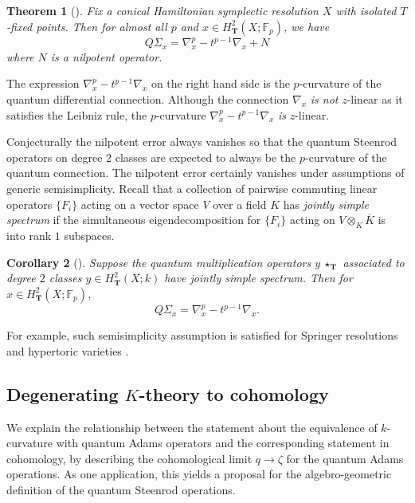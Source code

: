 \documentclass[reqno]{amsart}
\numberwithin{equation}{section}
\numberwithin{equation}{section}
\numberwithin{equation}{section}
\newtheorem{thm}{Theorem}[section]
\newtheorem{cor}[thm]{Corollary}
\theoremstyle{definition}
\theoremstyle{remark}
\theoremstyle{remark}
\begin{document}
\begin{thm}[{\cite[Theorem 1.2]{Lee23b}}]\label{thm:qst-is-pcurv}
    Fix a conical Hamiltonian symplectic resolution $X$ with isolated $T$-fixed points. Then for almost all $p$ and $x \in H^2_{\mathbf{T}}(X;\mathbb{F}_p)$, we have
    \begin{equation}
        Q\Sigma_x = \nabla_x^p - t^{p-1} \nabla_x + N
    \end{equation}
    where $N$ is a nilpotent operator.
\end{thm}
The expression $\nabla_x^p - t^{p-1}\nabla_x$ on the right hand side is the $p$-curvature of the quantum differential connection. Although the connection $\nabla_x$ \emph{is not} $z$-linear as it satisfies the Leibniz rule, the $p$-curvature $\nabla_x^p - t^{p-1} \nabla_x$ \emph{is} $z$-linear.

Conjecturally the nilpotent error always vanishes so that the quantum Steenrod operators on degree $2$ classes are expected to always be the $p$-curvature of the quantum connection. The nilpotent error certainly vanishes under assumptions of generic semisimplicity. Recall that a collection of pairwise commuting linear operators $\{F_i\}$ acting on a vector space $V$ over a field $K$ has \emph{jointly simple spectrum} if the simultaneous eigendecomposition for $\{F_i\}$ acting on $V \otimes_K \overline{K}$ is into rank $1$ subspaces.

\begin{cor}[{\cite[Corollary 5.2]{Lee23b}}]\label{thm:qst-is-pcurv-onthenose}
    Suppose the quantum multiplication operators $y  \ \star_\mathbf{T}$ associated to degree $2$ classes $y \in H^2_{\mathbf{T}}(X;k)$ have jointly simple spectrum. Then for $x \in H^2_{\mathbf{T}}(X;\mathbb{F}_p)$,
        \begin{equation}
        Q\Sigma_x = \nabla_x^p - t^{p-1} \nabla_x.
    \end{equation}
\end{cor}
For example, such semisimplicity assumption is satisfied for Springer resolutions \cite{Lee23a} and hypertoric varieties \cite{bai-lee}.


\subsection{Degenerating $K$-theory to cohomology}\label{ssec:quantumSteenrod-limit}


We explain the relationship between the statement about the equivalence of $k$-curvature with quantum Adams operators and the corresponding statement in cohomology, by describing the cohomological limit $q \to \zeta$ for the quantum Adams operations. As one application, this yields a proposal for the algebro-geometric definition of the quantum Steenrod operations.
\end{document}
